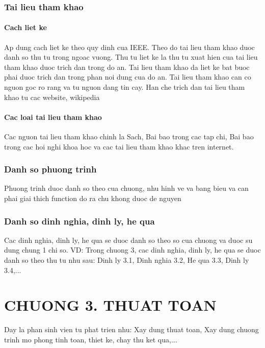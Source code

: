 \documentclass{article}
\begin{document}
\subsubsection{Tai lieu tham khao}
\paragraph{Cach liet ke}\mbox{}

Ap dung cach liet ke theo quy dinh cua IEEE. Theo do tai lieu tham khao duoc danh so thu tu trong ngoac vuong. Thu tu liet ke la thu tu xuat hien cua tai lieu tham khao duoc trich dan trong do an. Tai lieu tham khao da liet ke bat buoc phai duoc trich dan trong phan noi dung cua do an. Tai lieu tham khao can co nguon goc ro rang va tu nguon dang tin cay. Han che trich dan tai lieu tham khao tu cac website, wikipedia
\paragraph{Cac loai tai lieu tham khao}\mbox{}

Cac nguon tai lieu tham khao chinh la Sach, Bai bao trong cac tap chi, Bai bao trong cac hoi nghi khoa hoc va cac tai lieu tham khao khac tren internet.

\subsubsection{Danh so phuong trinh}
Phuong trinh duoc danh so theo cua chuong, nhu hinh ve va bang bieu va can phai giai thich function do ra chu khong duoc de nguyen

\subsubsection{Danh so dinh nghia, dinh ly, he qua}
Cac dinh nghia, dinh ly, he qua se duoc danh so theo so cua chuong va duoc su dung chung 1 chi so. VD: Trong chuong 3, cac dinh nghia, dinh ly, he qua se duoc danh so theo thu tu nhu sau: Dinh ly 3.1, Dinh nghia 3.2, He qua 3.3, Dinh ly 3.4,...
\newpage

\section*{CHUONG 3. THUAT TOAN}
\setcounter{section}{3}
\setcounter{subsection}{0}
\setcounter{figure}{0}
\setcounter{table}{0}
Day la phan sinh vien tu phat trien nhu: Xay dung thuat toan, Xay dung chuong trinh mo phong tinh toan, thiet ke, chay thu ket qua,...
\end{document}
